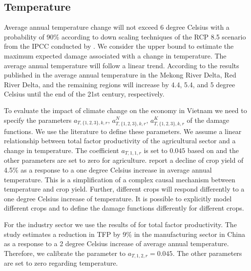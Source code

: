 \documentclass[10pt,a4paper]{article}
\begin{document}
\subsection{Temperature}

Average annual temperature change will not exceed 6 degree Celsius with a probability of 90\% according to down scaling techniques of the RCP 8.5 scenario from the IPCC conducted by \cite{thuc2016climate}. We consider the upper bound to estimate the maximum expected damage associated with a change in temperature. The average annual temperature will follow a linear trend. According to the results published in \cite{thuc2016climate} the average annual temperature in the Mekong River Delta, Red River Delta, and the remaining regions will increase by 4.4, 5.4, and 5 degree Celsius until the end of the 21st century, respectively. 

To evaluate the impact of climate change on the economy in Vietnam we need to specify the parameters $a_{T,\{1,2,3\},k,r}, \, a^{N}_{T,\{1,2,3\},k,r}, \, a^{K}_{T,\{1,2,3\},k,r}$ of the damage functions. We use the literature to define these parameters. We  assume a linear relationship between total factor productivity of the agricultural sector and a change in temperature. The coefficient $a_{T,1,1,r}$ is set to $0.045$ based on \cite{challinor2014meta} and the other parameters are set to zero for agriculture. \cite{challinor2014meta} report a decline of crop yield of 4.5\% as a response to a one degree Celsius increase in average annual temperature. This is a simplification of a complex causal mechanism between temperature and crop yield. Further, different crops will respond differently to a one degree Celsius increase of temperature. It is possible to explicitly model different crops and to define the damage functions differently for different crops. 

For the industry sector we use the results of \cite{zhang2018temperature} for total factor productivity. The study estimates a reduction in TFP by 9\% in the manufacturing sector in China as a response to a 2 degree Celsius increase of average annual temperature. Therefore, we calibrate the parameter to $a_{T,1,2,r} = 0.045$. The other parameters are set to zero regarding temperature.
\end{document}
